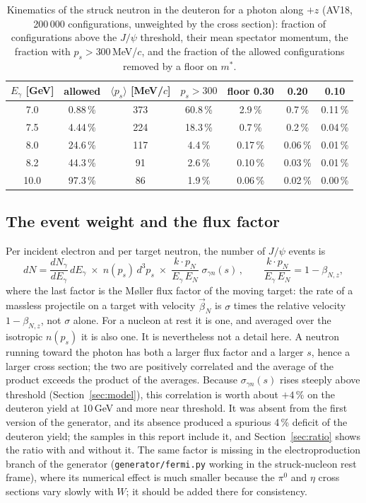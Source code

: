 \documentclass[11pt,a4paper]{article}
\newcommand{\Eg}{E_\gamma}
\newcommand{\jpsi}{J/\psi}
\newcommand{\ps}{p_s}
\begin{document}
\begin{table}[htbp]
\centering
\caption{Kinematics of the struck neutron in the deuteron for a photon along $+z$ (AV18, 200\,000
configurations, unweighted by the cross section): fraction of configurations above the $\jpsi$
threshold, their mean spectator momentum, the fraction with $\ps>300$\,MeV/$c$, and the fraction of
the allowed configurations removed by a floor on $m^*$.}
\label{tab:floor}
\begin{tabular}{ccccccc}
\toprule
$\Eg$ [GeV] & allowed & $\langle\ps\rangle$ [MeV/$c$] & $\ps>300$ & floor 0.30 & 0.20 & 0.10 \\
\midrule
7.0  & 0.88\,\% & 373 & 60.8\,\% & 2.9\,\%  & 0.7\,\%  & 0.11\,\% \\
7.5  & 4.44\,\% & 224 & 18.3\,\% & 0.7\,\%  & 0.2\,\%  & 0.04\,\% \\
8.0  & 24.6\,\% & 117 & 4.4\,\%  & 0.17\,\% & 0.06\,\% & 0.01\,\% \\
8.2  & 44.3\,\% & 91  & 2.6\,\%  & 0.10\,\% & 0.03\,\% & 0.01\,\% \\
10.0 & 97.3\,\% & 86  & 1.9\,\%  & 0.06\,\% & 0.02\,\% & 0.00\,\% \\
\bottomrule
\end{tabular}
\end{table}

\subsection{The event weight and the flux factor}
\label{sec:flux}

Per incident electron and per target neutron, the number of $\jpsi$ events is
\begin{equation}
dN=\frac{dN_\gamma}{d\Eg}\,d\Eg\;\times\;n(\ps)\,d^3\ps\;\times\;
\frac{k\cdot p_N}{\Eg\,E_N}\;\sigma_{\gamma n}(s)\,,
\qquad \frac{k\cdot p_N}{\Eg\,E_N}=1-\beta_{N,z},
\label{eq:weight}
\end{equation}
where the last factor is the M\o{}ller flux factor of the moving target: the rate of a massless
projectile on a target with velocity $\vec\beta_N$ is $\sigma$ times the relative velocity
$1-\beta_{N,z}$, not $\sigma$ alone.  For a nucleon at rest it is one, and averaged over the isotropic
$n(\ps)$ it is also one.  It is nevertheless not a detail here.  A neutron running toward the photon
has both a larger flux factor and a larger $s$, hence a larger cross section; the two are positively
correlated and the average of the product exceeds the product of the averages.  Because
$\sigma_{\gamma n}(s)$ rises steeply above threshold (Section~\ref{sec:model}), this correlation is
worth about $+4\,\%$ on the deuteron yield at 10\,GeV and more near threshold.  It was absent from the
first version of the generator, and its absence produced a spurious 4\,\% deficit of the deuteron
yield; the samples in this report include it, and Section~\ref{sec:ratio} shows the ratio with and
without it.  The same factor is missing in the electroproduction branch of the generator
(\texttt{generator/fermi.py} working in the struck-nucleon rest frame), where its numerical effect is
much smaller because the $\pi^0$ and $\eta$ cross sections vary slowly with $W$; it should be added
there for consistency.
\end{document}
